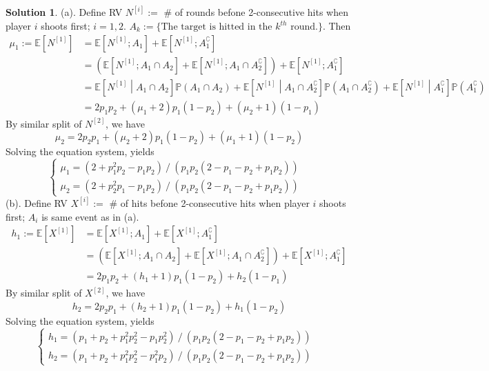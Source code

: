 \documentclass[a4paper, 10pt]{article}
\theoremstyle{definition}
\theoremstyle{hSol}
\newtheorem*{solution}{Solution}
\begin{document}
\begin{solution} (a). Define RV $N^{[i]}:=$ \# of rounds befone 2-consecutive hits when player $i$ shoots first; $i=1,2$. $A_k:=\{\text{The target is hitted in the $k^{th}$ round.}\}$. Then
\begin{equation}
  \begin{split}
    \mu_1:=\mathbb{E}\left[N^{[1]}\right] &= \mathbb{E}\left[N^{[1]}; A_1\right] + \mathbb{E}\left[N^{[1]}; A_1^{\complement}\right] \\
    &= \left(\mathbb{E}\left[N^{[1]}; A_1\cap A_2\right]+\mathbb{E}\left[N^{[1]}; A_1\cap A_2^{\complement}\right]\right) + \mathbb{E}\left[N^{[1]}; A_1^{\complement}\right] \\
    &= \mathbb{E}\left[N^{[1]}\middle|A_1\cap A_2\right]\mathbb{P}\left(A_1 \cap A_2\right)+\mathbb{E}\left[N^{[1]}\middle|A_1\cap A_2^{\complement}\right]\mathbb{P}\left(A_1 \cap A_2^{\complement}\right) + \mathbb{E}\left[N^{[1]}\middle|A_1^{\complement}\right]\mathbb{P}\left(A_1^{\complement}\right) \\
    &= 2p_1p_2 + (\mu_1+2)p_1(1-p_2) + (\mu_2+1)(1-p_1)
  \end{split}
\end{equation}
By similar split of $N^{[2]}$, we have
\begin{equation}
  \mu_2= 2p_2p_1 + (\mu_2+2)p_1(1-p_2) + (\mu_1+1)(1-p_2)
\end{equation}
Solving the equation system, yields
\begin{equation}
  \begin{cases}
  \mu_1 = (2+p_1^2p_2-p_1p_2)~/~(p_1p_2(2-p_1-p_2+p_1p_2)) & \\
  \mu_2 = (2+p_2^2p_1-p_1p_2)~/~(p_1p_2(2-p_1-p_2+p_1p_2))
  \end{cases}
\end{equation}
(b). Define RV $X^{[i]}:=$ \# of hits befone 2-consecutive hits when player $i$ shoots first; $A_i$ is same event as in (a).
\begin{equation}
  \begin{split}
    h_1:=\mathbb{E}\left[X^{[1]}\right] &= \mathbb{E}\left[X^{[1]}; A_1\right] + \mathbb{E}\left[X^{[1]}; A_1^{\complement}\right] \\
    &= \left(\mathbb{E}\left[X^{[1]}; A_1\cap A_2\right]+\mathbb{E}\left[X^{[1]}; A_1\cap A_2^{\complement}\right]\right) + \mathbb{E}\left[X^{[1]}; A_1^{\complement}\right] \\
    &= 2p_1p_2 + (h_1+1)p_1(1-p_2) + h_2(1-p_1)
  \end{split}
\end{equation}
By similar split of $X^{[2]}$, we have
\begin{equation}
  h_2= 2p_2p_1 + (h_2+1)p_1(1-p_2) + h_1(1-p_2)
\end{equation}
Solving the equation system, yields
\begin{equation}
  \begin{cases}
  h_1 = (p_1+p_2+p_1^2p_2^2-p_1p_2^2)~/~(p_1p_2(2-p_1-p_2+p_1p_2)) & \\
  h_2 = (p_1+p_2+p_1^2p_2^2-p_1^2p_2)~/~(p_1p_2(2-p_1-p_2+p_1p_2))
  \end{cases}
\end{equation}
\end{solution}
\end{document}
